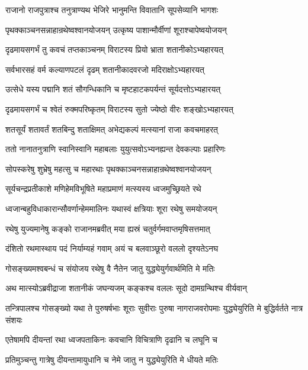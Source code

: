 \twolineshloka
{राजानो राजपुत्राश्च तनुत्राण्यथ भेजिरे}
{भानुमन्ति विवातानि सूपसेव्यानि भागशः}


\twolineshloka
{पृथक्काञ्चनसन्नाहान्रथेष्वश्वानयोजयन्}
{उत्कृष्य पाशान्मौर्वीणां शूराश्चापेष्वयोजयन्}


\twolineshloka
{दृढमायसगर्भं तु कवचं तप्तकाञ्चनम्}
{विराटस्य प्रियो भ्राता शतानीकोऽभ्यहारयत्}


\twolineshloka
{सर्वभारसहं वर्म कल्याणपटलं दृढम्}
{शतानीकादवरजो मदिराक्षोऽभ्यहारयत्}


\twolineshloka
{उत्सेधे यस्य पद्मानि शतं सौगन्धिकानि च}
{मृष्टहाटकपर्यन्तं सूर्यदत्तोऽभ्यहारयत्}


\twolineshloka
{दृढमायसगर्भं च श्वेतं रुक्मपरिष्कृतम्}
{विराटस्य सुतो ज्येष्ठो वीरः शङ्खोऽभ्यहारयत्}


\twolineshloka
{शतसूर्यं शतावर्तं शतबिन्दु शताक्षिमत्}
{अभेद्यकल्पं मत्स्यानां राजा कवचमाहरत्}


\twolineshloka
{ततो नानातनुत्राणि स्वानिस्वानि महाबलाः}
{युयुत्सवोऽभ्यनह्यन्त देवकल्पाः प्रहारिणः}


\twolineshloka
{सोपस्करेषु शुभ्रेषु महत्सु च महारथाः}
{पृथक्काञ्चनसन्नाहान्रथेष्वश्वानयोजयन्}


\twolineshloka
{सूर्यचन्द्रप्रतीकाशे मणिहेमविभूषिते}
{महाप्रमाणं मत्स्यस्य ध्वजमुच्छ्रियते रथे}


\twolineshloka
{ध्वजान्बहुविधाकारान्सौवर्णान्हेममालिनः}
{यथास्वं क्षत्रियाः शूरा रथेषु समयोजयन्}


\twolineshloka
{रथेषु युज्यमानेषु कङ्को राजानमब्रवीत्}
{मया ह्यस्रं चतुर्वर्गमवाप्तमृषिसत्तमात्}


\twolineshloka
{दंशितो रथमास्थाय पदं निर्याम्यहं गवाम्}
{अयं च बलवाञ्छूरो वललो दृश्यतेऽनघ}


\twolineshloka
{गोसङ्ख्यमश्वबन्धं च संयोजय रथेषु वै}
{नैतेन जातु युद्ध्येयुर्गवार्थमिति मे मतिः}



\twolineshloka
{अथ मात्स्योऽब्रवीद्राजा शतानीकं जघन्यजम्}
{कङ्कश्च वललः सूदो दामग्रन्थिश्च वीर्यवान्}


\threelineshloka
{तन्त्रिपालश्च गोसङ्ख्यो यथा ते पुरुषर्षभाः}
{शूराः सुवीराः पुरुषा नागराजवरोपमाः}
{युद्ध्येयुरिति मे बुद्धिर्वर्तते नात्र संशयः}


\twolineshloka
{एतेषामपि दीयन्तां रथा ध्वजपताकिनः}
{कवचानि विचित्राणि दृढानि च लघूनि च}


\twolineshloka
{प्रतिमुञ्चन्तु गात्रेषु दीयन्तामायुधानि च}
{नेमे जातु न युद्ध्येयुरिति मे धीयते मतिः}



